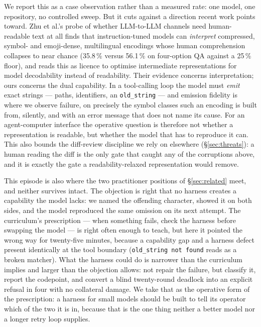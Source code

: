 \documentclass[smallcondensed,natbib]{svjour3}
\begin{document}
We report this as a case observation rather than a measured rate: one
model, one repository, no controlled sweep. But it cuts against a
direction recent work points toward. Zhu et al.'s probe of whether
LLM-to-LLM channels need human-readable text at all
\citep{zhu2026babeltele} finds that instruction-tuned models can
\emph{interpret} compressed, symbol- and emoji-dense, multilingual
encodings whose human comprehension collapses to near chance
(35.8\,\% versus 56.1\,\% on four-option QA against a 25\,\% floor),
and reads this as licence to optimise intermediate representations for
model decodability instead of readability. Their evidence concerns
interpretation; ours concerns the dual capability. In a tool-calling
loop the model must \emph{emit} exact strings --- paths, identifiers,
an \texttt{old\_string} --- and emission fidelity is where we observe
failure, on precisely the symbol classes such an encoding is built
from, silently, and with an error message that does not name its
cause. For an agent-computer interface the operative question is
therefore not whether a representation is readable, but whether the
model that has to reproduce it can. This also bounds the
diff-review discipline we rely on elsewhere (\S\ref{sec:threats}): a
human reading the diff is the only gate that caught any of the
corruptions above, and it is exactly the gate a
readability-relaxed representation would remove.

This episode is also where the two practitioner positions of
\S\ref{sec:related} meet, and neither survives intact. The objection is
right that no harness creates a capability the model lacks: we named
the offending character, showed it on both sides, and the model
reproduced the same omission on its next attempt. The curriculum's
prescription --- when something fails, check the harness before
swapping the model --- is right often enough to teach, but here it
pointed the wrong way for twenty-five minutes, because a capability gap
and a harness defect present identically at the tool boundary
(\texttt{old\_string not found} reads as a broken matcher). What the
harness could do is narrower than the curriculum implies and larger
than the objection allows: not repair the failure, but classify it,
report the codepoint, and convert a blind twenty-round deadlock into an
explicit refusal in four with no collateral damage. We take that as the
operative form of the prescription: a harness for small models should
be built to tell its operator which of the two it is in, because that
is the one thing neither a better model nor a longer retry loop
supplies.
\end{document}
